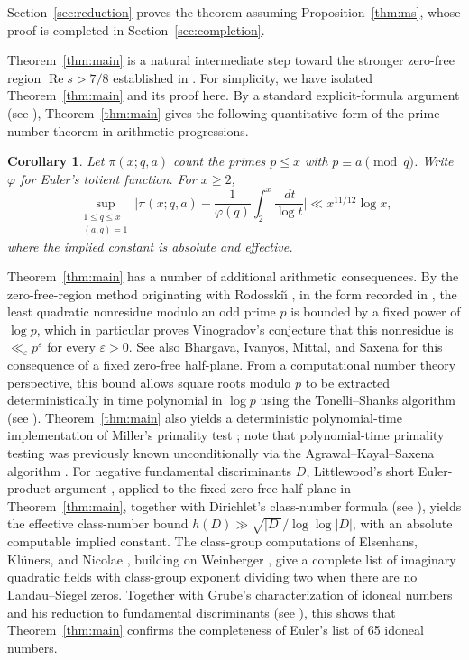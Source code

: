 \documentclass[11pt,a4paper]{article}
\numberwithin{equation}{section}
\numberwithin{figure}{section}
\newtheorem{corollary}[theorem]{Corollary}
\theoremstyle{definition}
\theoremstyle{remark}
\newcommand{\Rea}{\operatorname{Re}}
\newcommand{\dd}{\,d}
\begin{document}
Section~\ref{sec:reduction} proves the theorem assuming
Proposition~\ref{thm:ms}, whose proof is completed in
Section~\ref{sec:completion}.

Theorem~\ref{thm:main} is a natural intermediate step toward the stronger zero-free region $\Rea s>7/8$ established in \cite[Theorem~1.1]{OpenAI26}. For simplicity, we have isolated Theorem~\ref{thm:main} and its proof here.
By a standard explicit-formula argument (see \cite[Chapters~19--20]{Dav00}), Theorem~\ref{thm:main} gives the following quantitative form of the prime number theorem in arithmetic progressions.

\begin{corollary}\label{cor:primes-ap}
Let $\pi(x;q,a)$ count the primes $p\le x$ with $p\equiv a\pmod q$.
Write $\varphi$ for Euler's totient function.
For $x\ge2$,
\[
 \sup_{\substack{1\le q\le x\\(a,q)=1}}
 \biggl|\pi(x;q,a)-\frac1{\varphi(q)}
                  \int_2^x\frac{\dd t}{\log t}\biggr|
 \ll x^{11/12}\log x,
\]
where the implied constant is absolute and effective.
\end{corollary}

Theorem~\ref{thm:main} has a number of additional arithmetic consequences.
By the zero-free-region method originating with Rodosski\u{\i} \cite{Rod56},
in the form recorded in \cite[Theorem~13.12]{MV07}, the least quadratic nonresidue modulo
an odd prime $p$ is bounded by a fixed power of $\log p$, which in particular
proves Vinogradov's conjecture \cite{Vin85} that this nonresidue is
$\ll_{\varepsilon}p^{\varepsilon}$ for every $\varepsilon>0$.
See also Bhargava, Ivanyos, Mittal, and Saxena
\cite[Theorem~6.7]{BIMS17} for this consequence of a fixed zero-free half-plane.
From a computational number theory perspective, this bound allows square
roots modulo $p$ to be extracted deterministically in time polynomial in
$\log p$ using the Tonelli--Shanks algorithm
(see \cite[\S2.9]{Galbraith12}).
Theorem~\ref{thm:main} also yields a deterministic polynomial-time
implementation of Miller's primality test \cite{Mil76}; note that
polynomial-time primality testing was previously known unconditionally
via the Agrawal--Kayal--Saxena algorithm \cite{AKS04}.
For negative fundamental discriminants $D$, Littlewood's short Euler-product
argument \cite{Lit28}, applied to the fixed zero-free half-plane in
Theorem~\ref{thm:main}, together with Dirichlet's class-number formula
(see \cite[Chapter~6]{Dav00}), yields the effective class-number bound
$h(D)\gg\sqrt{|D|}/\log\log|D|$, with an absolute computable implied constant.
The class-group computations of Elsenhans, Kl\"uners, and Nicolae
\cite[Theorem~2]{EKN20}, building on Weinberger \cite{Wei73}, give a complete
list of imaginary quadratic fields with class-group exponent dividing two
when there are no Landau--Siegel zeros. Together with Grube's
characterization of idoneal numbers and his reduction to fundamental
discriminants \cite{Gru74} (see \cite[Theorem~6 and \S2.3]{Kani11}),
this shows that Theorem~\ref{thm:main} confirms the completeness of
Euler's list of 65 idoneal numbers.
\end{document}
